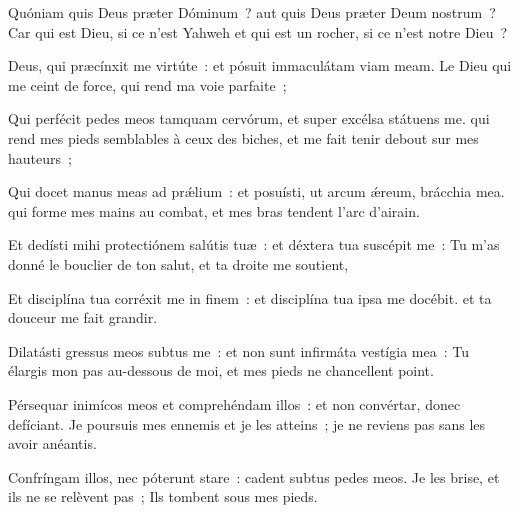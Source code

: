 
\begin{paracol}{2}

\LigneParacol{0cm}
{Quóniam quis Deus præter Dóminum~? \GreStar{} aut quis Deus præter Deum nostrum~?}
{Car qui est Dieu, si ce n'est Yahweh et qui est un rocher, si ce n'est notre Dieu~? }

\LigneParacol{0.2cm}
{Deus, qui præcínxit me virtúte~: \GreStar{} et pósuit immaculátam viam meam.}
{Le Dieu qui me ceint de force, qui rend ma voie parfaite~; }

\LigneParacol{0.2cm}
{Qui perfécit pedes meos tamquam cervórum, \GreStar{} et super excélsa státuens me.}
{qui rend mes pieds semblables à ceux des biches, et me fait tenir debout sur mes hauteurs~; }

\LigneParacol{0.2cm}
{Qui docet manus meas ad prǽlium~: \GreStar{} et posuísti, ut arcum ǽreum, brácchia mea.}
{qui forme mes mains au combat, et mes bras tendent l'arc d'airain. }

\LigneParacol{0.2cm}
{Et dedísti mihi protectiónem salútis tuæ~: \GreStar{} et déxtera tua suscépit me~:}
{Tu m'as donné le bouclier de ton salut, et ta droite me soutient,}

\LigneParacol{0.2cm}
{Et disciplína tua corréxit me in finem~: \GreStar{} et disciplína tua ipsa me docébit.}
{et ta douceur me fait grandir. }

\LigneParacol{0.2cm}
{Dilatásti gressus meos subtus me~: \GreStar{} et non sunt infirmáta vestígia mea~:}
{Tu élargis mon pas au-dessous de moi, et mes pieds ne chancellent point. }

\LigneParacol{0.2cm}
{Pérsequar inimícos meos et comprehéndam illos~: \GreStar{} et non convértar, donec defíciant.}
{Je poursuis mes ennemis et je les atteins~; je ne reviens pas sans les avoir anéantis. }

\LigneParacol{0.2cm}
{Confríngam illos, nec póterunt stare~: \GreStar{} cadent subtus pedes meos.}
{Je les brise, et ils ne se relèvent pas~; Ils tombent sous mes pieds. }

\end{paracol}
\Gloria
